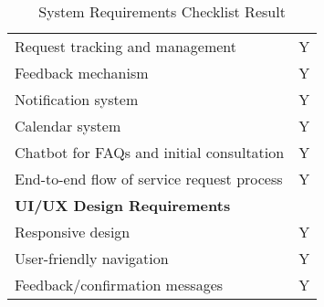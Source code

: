 \begin{table}[ht]
\begin{tabular}{|p{10cm}|c|}
		Request tracking and management & Y \\
		Feedback mechanism & Y \\
		Notification system & Y \\
		Calendar system & Y \\
		Chatbot for FAQs and initial consultation & Y \\
		End-to-end flow of service request process & Y \\
		\hline
		\multicolumn{2}{|l|}{\textbf{UI/UX Design Requirements}} \\
		\hline
		Responsive design & Y \\
		User-friendly navigation & Y \\
		Feedback/confirmation messages & Y \\
		\hline
	\end{tabular}
	\caption{System Requirements Checklist Result}
	\label{tab:summary_results}
\end{table}